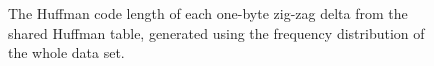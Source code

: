 \begin{figure}
	\centering

	\caption[The Huffman code length of each one-byte zig-zag delta from the shared Huffman table.]{\label{fig:shuff-len}The Huffman code length of each one-byte zig-zag delta from the shared Huffman table, generated using the frequency distribution of the whole data set.}
\end{figure}
